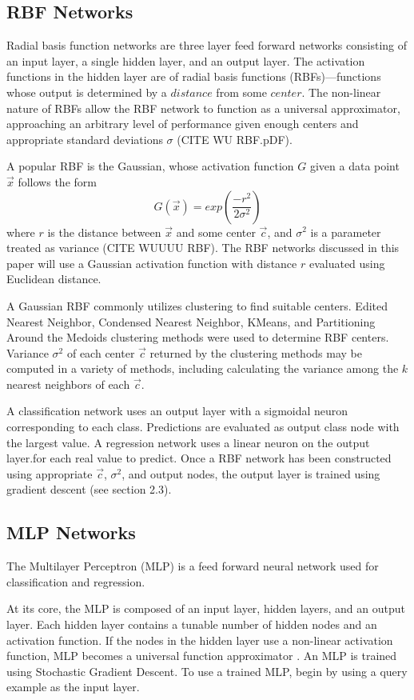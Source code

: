 \documentclass[twoside,11pt]{article}
\begin{document}
\subsection{RBF Networks}
	Radial basis function networks are three layer feed forward networks consisting of an input layer, a single hidden layer, and an output layer. The activation functions in the hidden layer are of radial basis functions (RBFs)---functions whose output is determined by a $distance$ from some $center$. The non-linear nature of RBFs allow the RBF network to function as a universal approximator, approaching an arbitrary level of performance given enough centers and appropriate standard deviations $\sigma$ (CITE WU RBF.pDF). %
	
	A popular RBF is the Gaussian, whose activation function $G$ given a data point $\vec{x}$ follows the form
	$$G(\vec{x}) = exp({\frac{-r^2}{2\sigma^2}})$$
	where $r$ is the distance between $\vec x$ and some center $\vec c$, and $\sigma^2$ is a parameter treated as variance (CITE WUUUU RBF). The RBF networks discussed in this paper will use a Gaussian activation function with distance $r$ evaluated using Euclidean distance.
	
	A Gaussian RBF commonly utilizes clustering to find suitable centers. Edited Nearest Neighbor, Condensed Nearest Neighbor, KMeans, and Partitioning Around the Medoids clustering methods were used to determine RBF centers. Variance $\sigma^2$ of each center $\vec c$ returned by the clustering methods may be computed in a variety of methods, including calculating the variance among the $k$ nearest neighbors of each $\vec c$. 
	
	A classification network uses an output layer with a sigmoidal neuron corresponding to each class. Predictions are evaluated as output class node with the largest value. A regression network uses a linear neuron on the output layer.for each real value to predict. Once a RBF network has been constructed using appropriate $\vec c$, $\sigma^2$, and output nodes, the output layer is trained using gradient descent (see section 2.3). 
	

\subsection{MLP Networks}
The Multilayer Perceptron (MLP) is a feed forward neural network used for classification and regression.

At its core, the MLP is composed of an input layer, hidden layers, and an output layer. Each hidden layer contains a tunable number of hidden nodes and an activation function. If the nodes in the hidden layer use a non-linear activation function, MLP becomes a universal function approximator \citep{svozil1997ffnn}.
An MLP is trained using Stochastic Gradient Descent.
To use a trained MLP, begin by using a query example as the input layer. 
\end{document}
